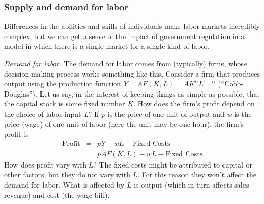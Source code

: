 \documentclass[letterpaper,12pt]{article}
\begin{document}
\subsubsection*{Supply and demand for labor}

Differences in the abilities and skills of individuals
make labor markets incredibly complex,
but we can get a sense of the impact of government regulation
in a model in which there is a single market for a single kind of labor.

{\it Demand for labor.\/}
The demand for labor comes from (typically) firms,
whose decision-making process works something like this.
Consider a firm that produces output using the production function
$Y= AF(K,L)=AK^{\alpha}L^{1-\alpha}$ (``Cobb-Douglas'').
Let us say,
in the interest of keeping things as simple as possible, that the
capital stock is some fixed number $K$. How does the firm's profit
depend on the choice of labor input $L$? If $p$ is the price of
one unit of output and $w$ is the price (wage) of one unit of
labor (here the unit may be one hour), the firm's profit is
%
\begin{eqnarray*}
    \mbox{Profit} &=& p Y - w L - \mbox{Fixed Costs} \\
                  &=& p A F(K,L) - w L - \mbox{Fixed Costs} .
\end{eqnarray*}
%
How does profit vary with $L$? The fixed costs might be attributed
to capital or other factors, but they do not vary with $L$.
For this reason they won't affect the demand for labor.  What is
affected by $L$ is output (which in turn affects sales revenue)
and cost (the wage bill).

\begin{comment}
If we increase labor by an amount
$\Delta L$, the increase in output is
%
\[
    \Delta Y  \;=\; F(K,L+\Delta L)-F(K,L)
        \;=\; \frac{F(K,L+\Delta L)-F(K,L)}{\Delta L}\Delta L.
\]
%
When $\Delta L$ is small, this is a derivative:
%
\begin{equation*}
    \Delta Y  \;\approx\; \frac{\partial F(K,L)}{\partial L}\Delta L.
\end{equation*}
%
(See the ``Mathematics Review'' if this seems overly mysterious.)
The increase in revenue is therefore $p\times \Delta Y = p \times
[\partial F(K,L)/\partial L] \Delta L$. What is the increase in
cost from the same increase $\Delta L$? Simply $w\Delta L$.
\end{comment}
\end{document}
